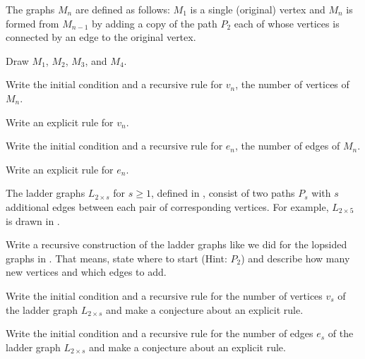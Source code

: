 \begin{exer}[\exerU] %
\label{exer_rec_def_windmill_graphs}
    The graphs $M_n$ are defined as follows: $M_1$ is a single (original) vertex and $M_n$ is formed from $M_{n-1}$ by adding a copy of the path $P_2$ each of whose vertices is connected by an edge to the original vertex.
        \begin{apart}
            \item Draw $M_1$, $M_2$, $M_3$, and $M_4$.  
            \item Write the initial condition and a recursive rule for $v_n$, the number of vertices of $M_n$.
            \item Write an explicit rule for $v_n$.
            \item Write the initial condition and a recursive rule for $e_n$, the number of edges of $M_n$.
            \item Write an explicit rule for $e_n$.
        \end{apart}
\end{exer}

\begin{exer}[\exerU] %
\label{exer_rec_ladder_graphs}
    The ladder graphs $L_{2 \times s}$ for $s \ge 1$, defined in , consist of two paths $P_s$ with $s$ additional edges between each pair of corresponding vertices.  For example, $L_{2 \times 5}$ is drawn in .
        \begin{exerpart}
            \item Write a recursive construction of the ladder graphs like we did for the lopsided graphs in .  That means, state where to start (Hint: $P_2$) and describe how many new vertices and which edges to add. 
            \item Write the initial condition and a recursive rule for the number of vertices $v_s$ of the ladder graph $L_{2 \times s}$ and make a conjecture about an explicit rule.
            \item Write the initial condition and a recursive rule for the number of edges $e_s$ of the ladder graph $L_{2 \times s}$  and make a conjecture about an explicit rule.
        \end{exerpart}
\end{exer}

